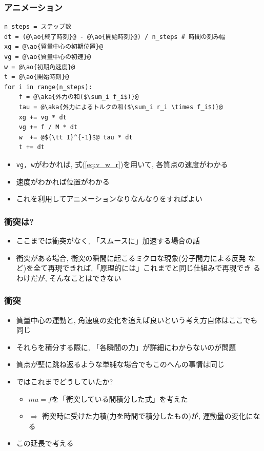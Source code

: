 \documentclass[10pt,dvipdfmx]{beamer}
\newcommand{\ao}[1]{{\color{blue}#1}}
\newcommand{\aka}[1]{{\color{red}#1}}
\begin{document}
\begin{frame}[fragile]
\frametitle{アニメーション}
\begin{lstlisting}
n_steps = ステップ数
dt = (@\ao{終了時刻}@ - @\ao{開始時刻}@) / n_steps # 時間の刻み幅
xg = @\ao{質量中心の初期位置}@
vg = @\ao{質量中心の初速}@
w = @\ao{初期角速度}@
t = @\ao{開始時刻}@
for i in range(n_steps):
    f = @\aka{外力の和($\sum_i f_i$)}@
    tau = @\aka{外力によるトルクの和($\sum_i r_i \times f_i$)}@
    xg += vg * dt
    vg += f / M * dt
    w  += @${\tt I}^{-1}$@ tau * dt
    t += dt
\end{lstlisting}

\begin{itemize}
\item {\tt vg, w}がわかれば, 式(\ref{eq:v_w_r})を用いて,
各質点の速度がわかる
\item 速度がわかれば位置がわかる
\item これを利用してアニメーションなりなんなりをすればよい
\end{itemize}
\end{frame}

\begin{frame}[fragile]
\frametitle{衝突は?}
\begin{itemize}
\item ここまでは衝突がなく, 「スムースに」加速する場合の話

\item 衝突がある場合, 衝突の瞬間に起こるミクロな現象(分子間力による反発
  など)を全て再現できれば,「原理的には」これまでと同じ仕組みで再現でき
  るわけだが, そんなことはできない


\end{itemize}

\end{frame}

\begin{frame}[fragile]
\frametitle{衝突}

\begin{itemize}
\item 質量中心の運動と, 角速度の変化を追えば良いという考え方自体はここでも同じ

\item それらを積分する際に, 「各瞬間の力」が詳細にわからないのが問題

\item 質点が壁に跳ね返るような単純な場合でもこのへんの事情は同じ

\item ではこれまでどうしていたか? 
  \begin{itemize}
  \item $ma = f$を「衝突している間積分した式」を考えた
  \item $\Rightarrow$ 衝突時に受けた力積(力を時間で積分したもの)が, 運動量の変化になる
  \end{itemize}
\item この延長で考える
\end{itemize}
\end{frame}
\end{document}
